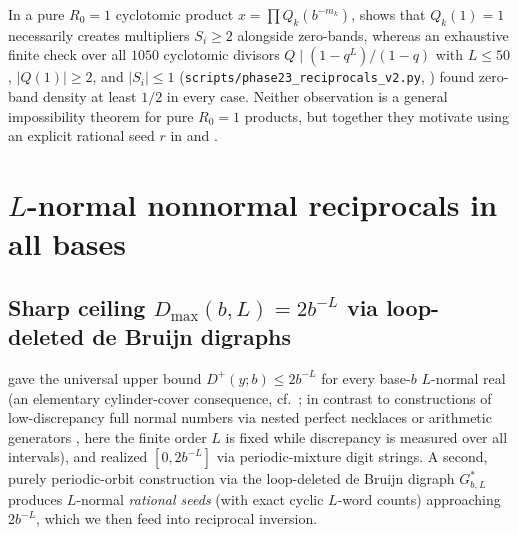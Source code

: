 \documentclass[11pt]{article}
\newcommand{\ttt}[1]{\texttt{#1}}
\begin{document}
\begin{remark}\label{rem:Q1-motivation}
In a pure $R_0=1$ cyclotomic product $x=\prod Q_k(b^{-m_k})$,  shows that $Q_k(1)=1$ necessarily creates multipliers $S_i\ge2$ alongside zero-bands, whereas an exhaustive finite check over all $1050$ cyclotomic divisors $Q\mid(1-q^L)/(1-q)$ with $L\le50$, $|Q(1)|\ge2$, and $|S_i|\le1$ (\ttt{scripts/phase23\_reciprocals\_v2.py}, ) found zero-band density at least $1/2$ in every case. Neither observation is a general impossibility theorem for pure $R_0=1$ products, but together they motivate using an explicit rational seed $r$ in  and .
\end{remark}

\section{$L$-normal nonnormal reciprocals in all bases}\label{sec:Lnormal}

\subsection{Sharp ceiling $D_{\max}(b,L)=2b^{-L}$ via loop-deleted de Bruijn digraphs}

 gave the universal upper bound $D^+(y;b)\le 2b^{-L}$ for every base-$b$ $L$-normal real (an elementary cylinder-cover consequence, cf.\ \cite[Chapter~4]{Bugeaud12}; in contrast to constructions of low-discrepancy full normal numbers via nested perfect necklaces \cite{BecherCarton19} or arithmetic generators \cite{BC02}, here the finite order $L$ is fixed while discrepancy is measured over all intervals), and  realized $[0,2b^{-L}]$ via periodic-mixture digit strings. A second, purely periodic-orbit construction via the loop-deleted de Bruijn digraph $G_{b,L}^*$ produces $L$-normal \emph{rational seeds} (with exact cyclic $L$-word counts) approaching $2b^{-L}$, which we then feed into reciprocal inversion.
\end{document}
